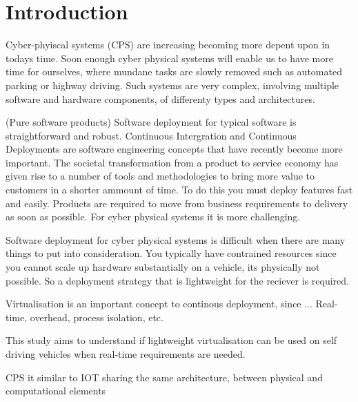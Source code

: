 \iffalse  \fi
\chapter{Introduction}
Cyber-phyiscal systems (CPS) are increasing becoming more depent upon in todays time. Soon enough cyber physical systems will enable us to have more time for ourselves, where mundane tasks are slowly removed such as automated parking or highway driving. Such systems are very complex, involving multiple software and hardware components, of differenty types and architectures. 

(Pure software products) Software deployment for typical software is straightforward and robust. Continuous Intergration and Continuous Deployments are software engineering concepts that have recently become more important. The societal transformation from a product to service economy has given rise to a number of tools and methodologies to bring more value to customers in a shorter ammount of time. To do this you must deploy features fast and easily. Products are required to move from business requirements to delivery as soon as possible. For cyber physical systems it is more challenging. 

Software deployment for cyber physical systems is difficult when there are many things to put into consideration. You typically have contrained resources since you cannot scale up hardware substantially on a vehicle, its physically not possible. So a deployment strategy that is lightweight for the reciever is required. 


Virtualisation is an important concept to continous deployment, since ... 
Real-time, overhead, process isolation, etc. 


This study aims to understand if lightweight virtualisation can be used on self driving vehicles when real-time requirements are needed. 

CPS it similar to IOT sharing the same architecture, between physical and computational elements


